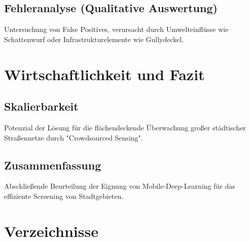 \documentclass[fontsize=13pt,a4paper, listof=entryprefix, bibliography=totocnumbered,toc=listofnumbered]{scrartcl}
\newcounter{verzeichnis}
\begin{document}
\subsection{Fehleranalyse (Qualitative Auswertung)}
Untersuchung von False Positives, verursacht durch Umwelteinflüsse wie Schattenwurf oder Infrastrukturelemente wie Gullydeckel.

\section{Wirtschaftlichkeit und Fazit}
\label{sec:fazit}

\subsection{Skalierbarkeit}
Potenzial der Lösung für die flächendeckende Überwachung großer städtischer Straßennetze durch "Crowdsourced Sensing".

\subsection{Zusammenfassung}
Abschließende Beurteilung der Eignung von Mobile-Deep-Learning für das effiziente Screening von Stadtgebieten.


 \label{Verzeichnisse}
\renewcommand{\thesection}{\Roman{verzeichnis}}
\section*{Verzeichnisse}
 \label{Literaturverzeichnis}
\renewcommand{\refname}{Literaturverzeichnis}
\printbibliography
\pagebreak

\listoffigures
\pagebreak


\listoftables
\pagebreak

\lstlistoflistings
\pagebreak

{}
\end{document}
